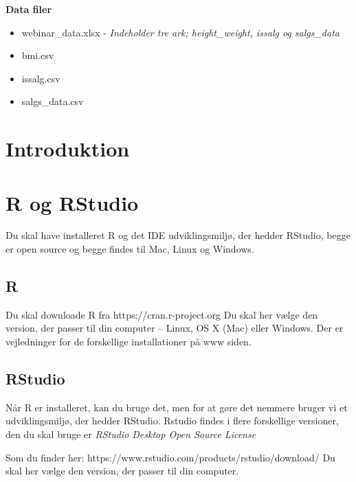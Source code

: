 \documentclass[
]{book}
\providecommand{\tightlist}{%
  \setlength{\itemsep}{0pt}\setlength{\parskip}{0pt}}
\begin{document}
\textbf{Data filer}

\begin{itemize}
\tightlist
\item
  webinar\_data.xlsx - \emph{Indeholder tre ark; height\_weight, issalg og salgs\_data}
\item
  bmi.csv
\item
  issalg.csv
\item
  salgs\_data.csv
\end{itemize}

\hypertarget{intro}{%
\chapter{Introduktion}\label{intro}}

\hypertarget{R_RStudio}{%
\chapter{R og RStudio}\label{R_RStudio}}

Du skal have installeret R og det IDE udviklingsmiljø, der hedder RStudio, begge er open source og begge findes til Mac, Linux og Windows.

\hypertarget{r}{%
\section{R}\label{r}}

Du skal downloade R fra
https://cran.r-project.org
Du skal her vælge den version, der passer til din computer -- Linux, OS X (Mac) eller Windows.
Der er vejledninger for de forskellige installationer på www siden.

\hypertarget{rstudio}{%
\section{RStudio}\label{rstudio}}

Når R er installeret, kan du bruge det, men for at gøre det nemmere bruger vi et udviklingsmiljø, der hedder RStudio. Rstudio findes i flere forskellige versioner, den du skal bruge er \emph{RStudio Desktop Open Source License}

Som du finder her: https://www.rstudio.com/products/rstudio/download/
Du skal her vælge den version, der passer til din computer.
\end{document}
